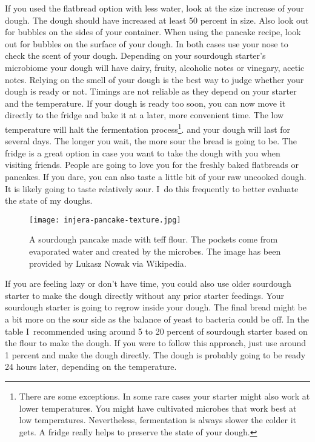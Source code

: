 If you used the flatbread option with less water, look at the size increase
of your dough. The dough should have increased at least 50 percent in size.
Also look out for bubbles on the sides of your container.
When using the pancake recipe, look out for bubbles on the surface of your dough.
In both cases use your nose to check the scent of your dough. Depending
on your sourdough starter's microbiome your dough will have
dairy, fruity, alcoholic notes or vinegary, acetic notes. Relying
on the smell of your dough is the best way to judge whether your
dough is ready or not. Timings are not reliable as they
depend on your starter and the temperature. If your dough
is ready too soon, you can now move it directly to the fridge and bake
it at a later, more convenient time. The low temperature will halt the fermentation
process\footnote{There are some exceptions. In some rare cases your starter
might also work at lower temperatures. You might have cultivated microbes that work best at
low temperatures. Nevertheless, fermentation
is always slower the colder it gets. A fridge really helps to preserve the state
of your dough.}.
and your dough will last for several days. The longer you wait, the more sour the
bread is going to be. The fridge is a great option in case you want to
take the dough with you when visiting friends. People are going
to love you for the freshly baked flatbreads or pancakes. If you dare,
you can also taste a little bit of your raw uncooked dough. It is likely
going to taste relatively sour. I~do this frequently to better evaluate the
state of my doughs.


\begin{figure}[htb!]
  \texttt{[image: injera-pancake-texture.jpg]}
  \centering
  \caption{A sourdough pancake made with teff flour. The pockets come from
  evaporated water and  created by the microbes.
  The image has been provided by Lukasz Nowak via Wikipedia.}
\end{figure}

If you are feeling lazy or don't have time, you could also use older sourdough starter
to make the dough directly without any prior starter feedings. Your sourdough starter
is going to regrow inside your dough. The
final bread might be a bit more on the sour side as the balance of yeast to
bacteria could be off. In the table I~recommended using around 5 to 20 percent
of sourdough starter based on the flour to make the dough. If you were to follow
this approach, just use around 1 percent and make the dough directly.
The dough is probably going to be ready 24 hours later, depending on the temperature.

